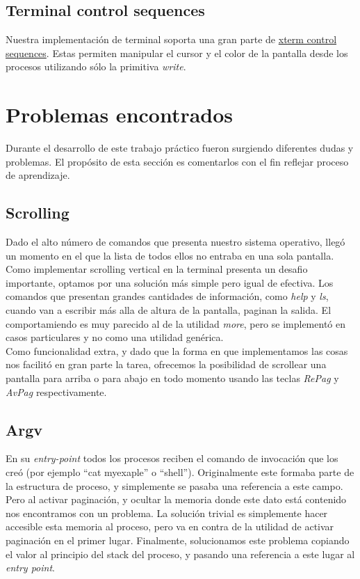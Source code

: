 \documentclass[a4paper,10pt]{article}
\begin{document}
        \subsection{Terminal control sequences}
        Nuestra implementación de terminal soporta una gran parte de \href{http://invisible-island.net/xterm/ctlseqs/ctlseqs.html}{xterm control sequences}.
        Estas permiten manipular el cursor y el color de la pantalla desde los procesos utilizando sólo la primitiva \textit{write}.


\newpage
\section{Problemas encontrados}
\label{sec:Problemas encontrados}

Durante el desarrollo de este trabajo práctico fueron surgiendo diferentes dudas y problemas. El propósito de esta
sección es comentarlos con el fin reflejar proceso de aprendizaje.

        \subsection{Scrolling}
        Dado el alto número de comandos que presenta nuestro sistema operativo, llegó un momento en el que la lista de todos ellos no entraba en una sola pantalla.
        Como implementar scrolling vertical en la terminal presenta un desafio importante, optamos por una solución más simple pero igual de efectiva.
        Los comandos que presentan grandes cantidades de información, como \textit{help} y \textit{ls}, cuando van a escribir más alla de altura de la pantalla, 
        paginan la salida.
        El comportamiendo es muy parecido al de la utilidad \textit{more}, pero se implementó en casos particulares y no como una utilidad genérica. \\


        Como funcionalidad extra, y dado que la forma en que implementamos las cosas nos facilitó en gran parte la tarea, ofrecemos la posibilidad de scrollear una 
        pantalla para arriba o para abajo en todo momento usando las teclas \textit{RePag} y \textit{AvPag} respectivamente.

        \subsection{Argv}
        En su \textit{entry-point} todos los procesos reciben el comando de invocación que los creó (por ejemplo ``cat myexaple'' o ``shell'').
        Originalmente este formaba parte de la estructura de proceso, y simplemente se pasaba una referencia a este campo.
        Pero al activar paginación, y ocultar la memoria donde este dato está contenido nos encontramos con un problema.
        La solución trivial es simplemente hacer accesible esta memoria al proceso, pero va en contra de la utilidad de activar paginación en el primer lugar.
        Finalmente, solucionamos este problema copiando el valor al principio del stack del proceso, y pasando una referencia a este lugar al \textit{entry point}.
\end{document}
